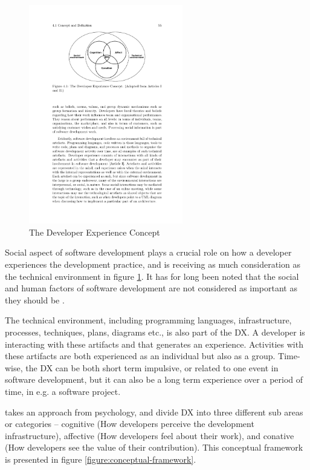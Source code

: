 \documentclass[english, 12pt, a4paper, sci, utf8, a-1b, online]{aaltothesis}
\begin{document}
\begin{figure}
  \begin{center}
    \includegraphics[width=0.6\textwidth]{dx-social-technical.pdf}
  \end{center}
  \captionsetup{width=0.6\textwidth}
  \caption{The Developer Experience Concept \parencite{fagerholm-doctoral-thesis}}
  \label{figure:social-technical}
\end{figure}



Social aspect of software development plays a crucial role on how a developer experiences the development practice, and is receiving as much consideration as the technical environment in figure \ref{figure:social-technical}. It has for long been noted that the social and human factors of software development are not considered as important as they should be \parencite{human-factor}.

The technical environment, including programming languages, infrastructure, processes, techniques, plans, diagrams etc., is also part of the DX. A developer is interacting with these artifacts and that generates an experience. Activities with these artifacts are both experienced as an individual but also as a group. Time-wise, the DX can be both short term impulsive, or related to one event in software development, but it can also be a long term experience over a period of time, in e.g. a software project.

\textcite{fagerholm-dx-concept-and-definition} takes an approach from psychology, and divide DX into three different sub areas or categories – cognitive (How developers perceive the development infrastructure), affective (How developers feel about their work), and conative (How developers see the value of their contribution). This conceptual framework is presented in figure \ref{figure:conceptual-framework}.
\end{document}
